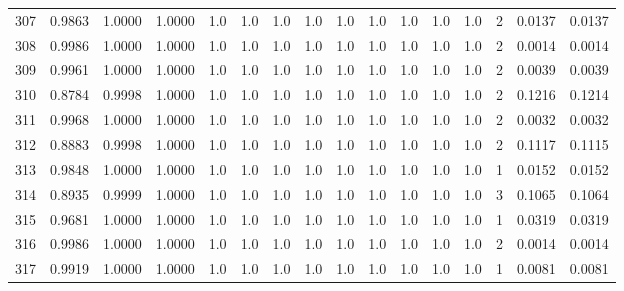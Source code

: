 \begin{tabular}{lrrrrrrrrrrrrrrr}
307 &      0.9863 &  1.0000 &  1.0000 &     1.0 &     1.0 &     1.0 &     1.0 &     1.0 &     1.0 &     1.0 &      1.0 &        1.0 &      2 &                    0.0137 &                     0.0137 \\
308 &      0.9986 &  1.0000 &  1.0000 &     1.0 &     1.0 &     1.0 &     1.0 &     1.0 &     1.0 &     1.0 &      1.0 &        1.0 &      2 &                    0.0014 &                     0.0014 \\
309 &      0.9961 &  1.0000 &  1.0000 &     1.0 &     1.0 &     1.0 &     1.0 &     1.0 &     1.0 &     1.0 &      1.0 &        1.0 &      2 &                    0.0039 &                     0.0039 \\
310 &      0.8784 &  0.9998 &  1.0000 &     1.0 &     1.0 &     1.0 &     1.0 &     1.0 &     1.0 &     1.0 &      1.0 &        1.0 &      2 &                    0.1216 &                     0.1214 \\
311 &      0.9968 &  1.0000 &  1.0000 &     1.0 &     1.0 &     1.0 &     1.0 &     1.0 &     1.0 &     1.0 &      1.0 &        1.0 &      2 &                    0.0032 &                     0.0032 \\
312 &      0.8883 &  0.9998 &  1.0000 &     1.0 &     1.0 &     1.0 &     1.0 &     1.0 &     1.0 &     1.0 &      1.0 &        1.0 &      2 &                    0.1117 &                     0.1115 \\
313 &      0.9848 &  1.0000 &  1.0000 &     1.0 &     1.0 &     1.0 &     1.0 &     1.0 &     1.0 &     1.0 &      1.0 &        1.0 &      1 &                    0.0152 &                     0.0152 \\
314 &      0.8935 &  0.9999 &  1.0000 &     1.0 &     1.0 &     1.0 &     1.0 &     1.0 &     1.0 &     1.0 &      1.0 &        1.0 &      3 &                    0.1065 &                     0.1064 \\
315 &      0.9681 &  1.0000 &  1.0000 &     1.0 &     1.0 &     1.0 &     1.0 &     1.0 &     1.0 &     1.0 &      1.0 &        1.0 &      1 &                    0.0319 &                     0.0319 \\
316 &      0.9986 &  1.0000 &  1.0000 &     1.0 &     1.0 &     1.0 &     1.0 &     1.0 &     1.0 &     1.0 &      1.0 &        1.0 &      2 &                    0.0014 &                     0.0014 \\
317 &      0.9919 &  1.0000 &  1.0000 &     1.0 &     1.0 &     1.0 &     1.0 &     1.0 &     1.0 &     1.0 &      1.0 &        1.0 &      1 &                    0.0081 &                     0.0081 \\

\end{tabular}
